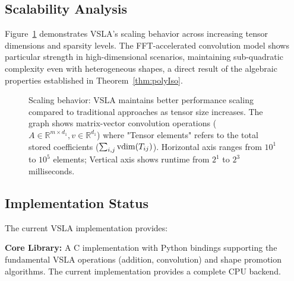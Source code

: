 \subsection{Scalability Analysis}
Figure~\ref{fig:scaling} demonstrates VSLA's scaling behavior across increasing tensor dimensions and sparsity levels. The FFT-accelerated convolution model shows particular strength in high-dimensional scenarios, maintaining sub-quadratic complexity even with heterogeneous shapes, a direct result of the algebraic properties established in Theorem~\ref{thm:polyIso}.

\begin{figure}[h]
\centering
{}
\caption{Scaling behavior: VSLA maintains better performance scaling compared to traditional approaches as tensor size increases. The graph shows matrix-vector convolution operations ($A \in \mathbb{R}^{m \times d_1}, v \in \mathbb{R}^{d_1}$) where "Tensor elements" refers to the total stored coefficients ($\sum_{i,j} \operatorname{vdim}(T_{ij})$). Horizontal axis ranges from $10^1$ to $10^5$ elements; Vertical axis shows runtime from $2^1$ to $2^3$ milliseconds.}
\label{fig:scaling}
\end{figure}

\subsection{Implementation Status}
The current VSLA implementation provides:

\textbf{Core Library:} A C implementation with Python bindings supporting the fundamental VSLA operations (addition, convolution) and shape promotion algorithms. The current implementation provides a complete CPU backend.

